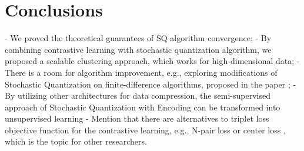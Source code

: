 \section{Conclusions}

 - We proved the theoretical guarantees of SQ algorithm convergence;
 - By combining contrastive learning with stochastic quantization algorithm, we proposed a scalable clustering approach, which works for high-dimensional data;
 - There is a room for algorithm improvement, e.g., exploring modifications of Stochastic Quantization on finite-difference algorithms, proposed in the paper \cite{Norkin_Kozyriev_Norkin_2024};
 - By utilizing other architectures for data compression, the semi-supervised approach of Stochastic Quantization with Encoding can be transformed into unsupervised learning
 - Mention that there are alternatives to triplet loss objective function \cite{Hoffer_2015} for the contrastive learning, e.g., N-pair loss \cite{Sohn_2016} or center loss \cite{qi2017}, which is the topic for other researchers.